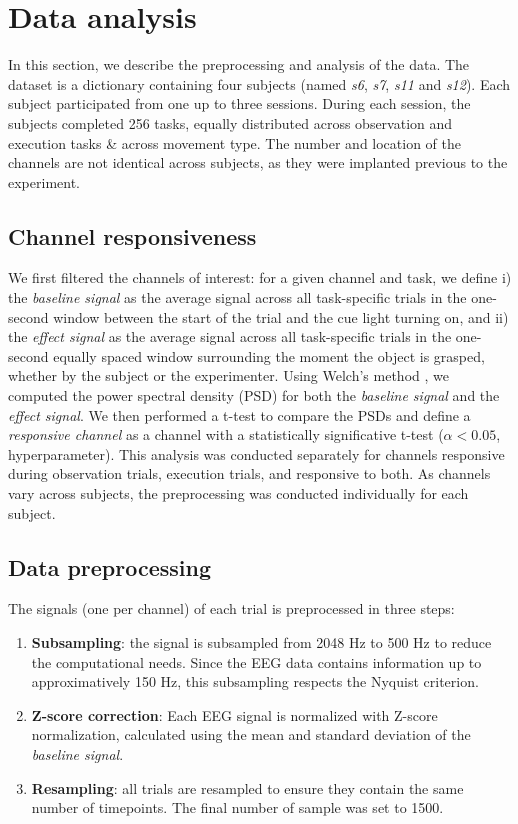 \documentclass[10pt,conference,compsocconf]{IEEEtran}
\begin{document}
\section{Data analysis}
\label{sec:analysis}
In this section, we describe the preprocessing and analysis of the data. The dataset is a dictionary containing four subjects (named \textit{s6}, \textit{s7}, \textit{s11} and \textit{s12}). Each subject participated from one up to three sessions. During each session, the subjects completed 256 tasks, equally distributed across observation and execution tasks \& across movement type. The number and location of the channels are not identical across subjects, as they were implanted previous to the experiment.

\subsection{Channel responsiveness}
\label{sec:channelresponsiveness}
We first filtered the channels of interest: for a given channel and task, we define i) the \textit{baseline signal} as the average signal across all task-specific trials in the one-second window between the start of the trial and the cue light turning on, and ii) the \textit{effect signal} as the average signal across all task-specific trials in the one-second equally spaced window surrounding the moment the object is grasped, whether by the subject or the experimenter. Using Welch's method \cite{welch}, we computed the power spectral density (PSD) for both the \textit{baseline signal} and the \textit{effect signal}. We then performed a t-test to compare the PSDs and define a \textit{responsive channel} as a channel with a statistically significative t-test (\(\alpha<0.05\), hyperparameter). This analysis was conducted separately for channels responsive during observation trials, execution trials, and responsive to both. As channels vary across subjects, the preprocessing was conducted individually for each subject.

\subsection{Data preprocessing}
\label{subsec:preproc}
The signals (one per channel) of each trial is preprocessed in three steps:
\begin{enumerate}
  \item \textbf{Subsampling}: the signal is subsampled from 2048 Hz to 500 Hz to reduce the computational needs. Since the EEG data contains information up to approximatively 150 Hz, this subsampling respects the Nyquist criterion.
  \item \textbf{Z-score correction}: Each EEG signal is normalized with Z-score normalization, calculated using the mean and standard deviation of the \textit{baseline signal}.
  \item \textbf{Resampling}: all trials are resampled to ensure they contain the same number of timepoints. The final number of sample was set to 1500.
\end{enumerate}
\end{document}
